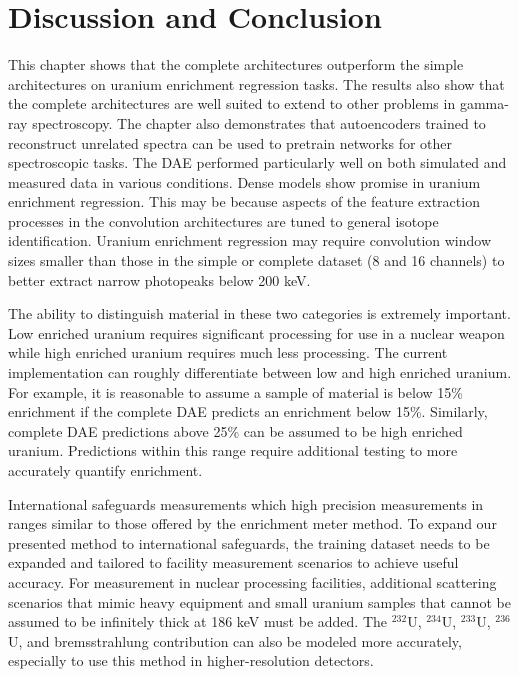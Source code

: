 \section{Discussion and Conclusion}

This chapter shows that the complete architectures outperform the simple architectures on uranium enrichment regression tasks. The results also show that the complete architectures are well suited to extend to other problems in gamma-ray spectroscopy. The chapter also demonstrates that autoencoders trained to reconstruct unrelated spectra can be used to pretrain networks for other spectroscopic tasks. The DAE performed particularly well on both simulated and measured data in various conditions. Dense models show promise in uranium enrichment regression. This may be because aspects of the feature extraction processes in the convolution architectures are tuned to general isotope identification. Uranium enrichment regression may require convolution window sizes smaller than those in the simple or complete dataset (8 and 16 channels) to better extract narrow photopeaks below 200 keV. 

The ability to distinguish material in these two categories is extremely important. Low enriched uranium requires significant processing for use in a nuclear weapon while high enriched uranium requires much less processing. The current implementation can roughly differentiate between low and high enriched uranium. For example, it is reasonable to assume a sample of material is below 15\% enrichment if the complete DAE predicts an enrichment below 15\%. Similarly, complete DAE predictions above 25\% can be assumed to be high enriched uranium. Predictions within this range require additional testing to more accurately quantify enrichment.

International safeguards measurements which high precision measurements in ranges similar to those offered by the enrichment meter method. To expand our presented method to international safeguards, the training dataset needs to be expanded and tailored to facility measurement scenarios to achieve useful accuracy. For measurement in nuclear processing facilities, additional scattering scenarios that mimic heavy equipment and small uranium samples that cannot be assumed to be infinitely thick at 186 keV must be added. The $^{232}$U, $^{234}$U, $^{233}$U, $^{236}$U, and bremsstrahlung contribution can also be modeled more accurately, especially to use this method in higher-resolution detectors.







